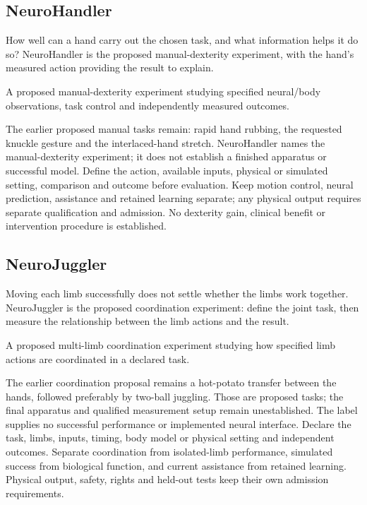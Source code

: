 \subsection*{NeuroHandler}
\noindent How well can a hand carry out the chosen task, and what information helps it do so? NeuroHandler is the proposed manual-dexterity experiment, with the hand’s measured action providing the result to explain.\par
\noindent A proposed manual-dexterity experiment studying specified neural/body observations, task control and independently measured outcomes.\par
\noindent The earlier proposed manual tasks remain: rapid hand rubbing, the requested knuckle gesture and the interlaced-hand stretch. NeuroHandler names the manual-dexterity experiment; it does not establish a finished apparatus or successful model. Define the action, available inputs, physical or simulated setting, comparison and outcome before evaluation. Keep motion control, neural prediction, assistance and retained learning separate; any physical output requires separate qualification and admission. No dexterity gain, clinical benefit or intervention procedure is established.\par

\subsection*{NeuroJuggler}
\noindent Moving each limb successfully does not settle whether the limbs work together. NeuroJuggler is the proposed coordination experiment: define the joint task, then measure the relationship between the limb actions and the result.\par
\noindent A proposed multi-limb coordination experiment studying how specified limb actions are coordinated in a declared task.\par
\noindent The earlier coordination proposal remains a hot-potato transfer between the hands, followed preferably by two-ball juggling. Those are proposed tasks; the final apparatus and qualified measurement setup remain unestablished. The label supplies no successful performance or implemented neural interface. Declare the task, limbs, inputs, timing, body model or physical setting and independent outcomes. Separate coordination from isolated-limb performance, simulated success from biological function, and current assistance from retained learning. Physical output, safety, rights and held-out tests keep their own admission requirements.\par

